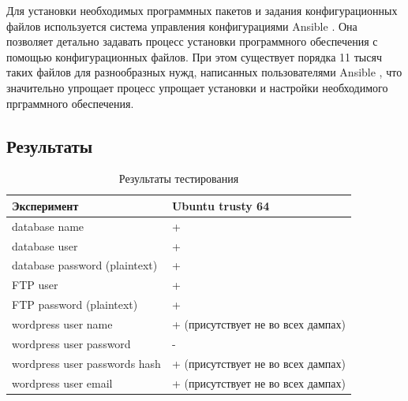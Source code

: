 \documentclass[20pt]{article}
\begin{document}
Для установки необходимых программных пакетов и задания конфигурационных файлов
используется система управления конфигурациями Ansible \cite{ansible}. Она
позволяет детально задавать процесс установки программного обеспечения с помощью
конфигурационных файлов. При этом существует порядка 11 тысяч таких файлов для
разнообразных нужд, написанных пользователями Ansible \cite{ansible-galaxy},
что значительно упрощает процесс упрощает установки и настройки необходимого
прграммного обеспечения.

\subsection{Результаты}

\begin{table}[]
\caption{Результаты тестирования}
\label{results-label}
\begin{tabular}{|l|l|}
\hline
Эксперимент                                                                                     & Ubuntu trusty 64               \\  \hline
database name                                                                                   & +                              \\  \hline
database user                                                                                   & +                              \\  \hline
database password (plaintext)                                                                   & +                              \\  \hline
FTP user                                                                                        & +                              \\  \hline
FTP password (plaintext)                                                                        & +                              \\  \hline
wordpress user name                                                                             & + (присутствует не во всех дампах) \\  \hline
wordpress user password                                                                         & -                              \\  \hline
wordpress user passwords hash                                                                   & + (присутствует не во всех дампах) \\  \hline
wordpress user email                                                                            & + (присутствует не во всех дампах) \\  \hline

\end{tabular}
\end{table}
\end{document}
